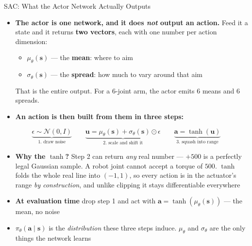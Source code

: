 \begin{frame}{SAC: What the Actor Network Actually Outputs}
\small
\begin{itemize}
    \item \textbf{The actor is one network, and it does \emph{not} output an action.} Feed it a state and it returns \textbf{two vectors}, each with one number per action dimension:
    \begin{itemize}
        \item $\mu_\theta(\mathbf{s})$ --- the \textbf{mean}: where to aim
        \item $\sigma_\theta(\mathbf{s})$ --- the \textbf{spread}: how much to vary around that aim
    \end{itemize}
    That is the entire output. For a 6-joint arm, the actor emits 6 means and 6 spreads.
    \vspace{0.4em}
    \item \textbf{An action is then built from them in three steps:}
\end{itemize}
\vspace{-0.2em}
\[
\underbrace{\epsilon \sim \mathcal{N}(0, I)}_{\text{1. draw noise}}
\qquad
\underbrace{\mathbf{u} = \mu_\theta(\mathbf{s}) + \sigma_\theta(\mathbf{s}) \odot \epsilon}_{\text{2. scale and shift it}}
\qquad
\underbrace{\mathbf{a} = \tanh(\mathbf{u})}_{\text{3. squash into range}}
\]
\vspace{-0.2em}
\begin{itemize}
    \item \textbf{Why the $\tanh$?} Step 2 can return \emph{any} real number --- $+500$ is a perfectly legal Gaussian sample. A robot joint cannot accept a torque of $500$. $\tanh$ folds the whole real line into $(-1,1)$, so every action is in the actuator's range \emph{by construction}, and unlike clipping it stays differentiable everywhere
    \vspace{0.2em}
    \item \textbf{At evaluation time} drop step 1 and act with $\mathbf{a} = \tanh(\mu_\theta(\mathbf{s}))$ --- the mean, no noise
    \vspace{0.2em}
    \item[$\Rightarrow$] $\pi_\theta(\mathbf{a}\mid\mathbf{s})$ is the \emph{distribution} these three steps induce. $\mu_\theta$ and $\sigma_\theta$ are the only things the network learns
\end{itemize}
\end{frame}

